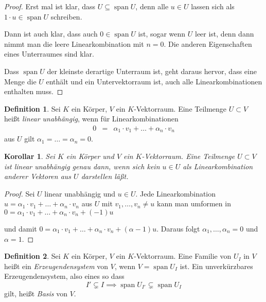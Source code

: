 \documentclass[index=totoc]{scrartcl}%
\newtheorem{cor}[thm]{Korollar}
\theoremstyle{definition}
\newtheorem{defi}{Definition}[section]
\DeclareMathOperator{\spann}{span}
\begin{document}
\begin{proof}
  Erst mal ist klar, dass $U\subseteq \spann U$,
  denn alle $u\in U$ lassen sich als $1\cdot u\in\spann U$ schreiben.
  
  Dann ist auch klar, dass auch $0\in \spann U$ ist,
  sogar wenn $U$ leer ist, denn dann nimmt man die leere Linearkombination
  mit $n=0$.
  Die anderen Eigenschaften eines Unterraumes sind klar.

  Dass $\spann U$ der kleinste derartige Unterraum ist,
  geht daraus hervor, dass eine Menge die $U$ enthält
  und ein Untervektorraum ist,
  auch alle Linearkombinationen enthalten muss. 
\end{proof}

\begin{defi}
  Sei $K$ ein Körper, $V$ ein $K$-Vektorraum.
  Eine Teilmenge $U\subset V$ heißt {\em linear unabhängig},
  wenn für Linearkombinationen 
  \begin{eqnarray*}
    0&=&\alpha_1\cdot v_1+\ldots+\alpha_n\cdot v_n
  \end{eqnarray*}
  aus $U$ gilt $\alpha_1=\ldots=\alpha_n=0$. 
\end{defi}

\begin{cor}
  Sei $K$ ein Körper und $V$ ein $K$-Vektorraum.
  Eine Teilmenge $U\subset V$ ist linear unabhängig genau dann,
  wenn sich kein $u\in U$ als Linearkombination anderer Vektoren aus $U$
  darstellen läßt. 
\end{cor}

\begin{proof}
  Sei $U$ linear unabhängig und $u\in U$.
  Jede Linearkombination $u=\alpha_1\cdot v_1+\ldots+\alpha_n\cdot v_n$
  aus $U$ mit $v_1,\dots,v_n\not=u$ kann man umformen in 
  $0=\alpha_1\cdot v_1+\ldots+\alpha_n\cdot v_n+(-1) u$
  
  und damit $0=\alpha_1\cdot v_1+\ldots+\alpha_n\cdot v_n+(\alpha-1) u$.
  Daraus folgt $\alpha_1,\dots,\alpha_n=0$ und $\alpha=1$. 
\end{proof}


\begin{defi}
  Sei $K$ ein Körper, $V$ ein $K$-Vektorraum. 
  Eine Familie von $U_I$ in $V$ heißt ein {\em Erzeugendensystem}
  von $V$, wenn $V=\spann U_I$ ist. 
  Ein unverkürzbares Erzeugendensystem,
  also eines so dass
  \begin{equation*}
      I'\subsetneq I \implies\spann U_{I'}\subsetneq\spann U_I
  \end{equation*}
  gilt, heißt {\em Basis} von $V$. 
\end{defi}
\end{document}
